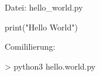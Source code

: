 \documentclass[
  11pt,
  a4paper,
  DIV=11,
  numbers=noendperiod]{scrartcl}
\newenvironment{Shaded}{\begin{snugshade}}{\end{snugshade}}
\newcommand{\BuiltInTok}[1]{\textcolor[rgb]{0.00,0.23,0.31}{#1}}
\newcommand{\NormalTok}[1]{\textcolor[rgb]{0.00,0.23,0.31}{#1}}
\newcommand{\StringTok}[1]{\textcolor[rgb]{0.13,0.47,0.30}{#1}}
\begin{document}
Datei: hello\_world.py

\begin{Shaded}
\begin{Highlighting}[numbers=left,,]
    \BuiltInTok{print}\NormalTok{(}\StringTok{"Hello World"}\NormalTok{)}
\end{Highlighting}
\end{Shaded}

Comililierung:

\begin{Shaded}
\begin{Highlighting}[numbers=left,,]
\NormalTok{\textgreater{} python3 hello.world.py}
\end{Highlighting}
\end{Shaded}
\end{document}
